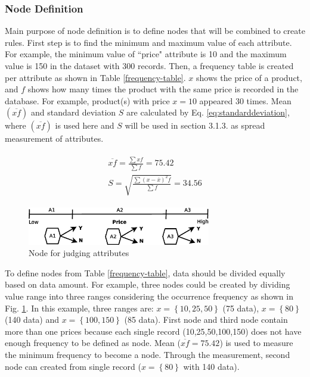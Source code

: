 \documentclass[fleqn,10pt,twocolumn]{SICE14}
\begin{document}
\subsubsection{Node Definition}
Main purpose of node definition is to define nodes that will be combined to create rules. First step is to find the minimum and maximum value of each attribute. For example, the minimum value of ``price" attribute is 10 and the maximum value is 150 in the dataset with 300 records. Then, a frequency table is created per attribute as shown in Table \ref{frequency-table}. 
$x$ shows the price of a product, and $f$ shows how many times the product with the same price is recorded in the database. For example, product(s) with price $x=10$ appeared 30 times.
Mean $(\overline{xf})$ and standard deviation $S$ are calculated by Eq. \ref{eq:standarddeviation}, where $(\overline{xf})$ is used here and $S$ will be used in section 3.1.3. as spread measurement of attributes.

\begin{eqnarray}
\begin{array}{lll}
\overline{xf}=\frac{\sum xf}{\sum f}=75.42 \\
S=\sqrt{\frac{\sum(x-\overline{x})^{2}f}{\sum f}}=34.56
\end{array}
\label{eq:standarddeviation}
\end{eqnarray}

\begin{figure}[tb]
\begin{center}
\includegraphics[width=8cm]{attributejudge}
\caption{\label{nodejudge} Node for judging attributes}
\end{center}
\end{figure}

To define nodes from Table \ref{frequency-table}, data should be divided equally based on data amount. For example, three nodes could be created by dividing value range into three ranges considering the occurrence frequency as shown in Fig. \ref{nodejudge}. In this example, three ranges are: $x = \left\{ 10,25,50 \right\} $ (75 data), $x = \left\{ 80 \right\} $ (140 data) and $x = \left\{ 100,150 \right\} $ (85 data). First node and third node contain more than one prices because each single record (10,25,50,100,150) does not have enough frequency to be defined as node. Mean ($\overline{xf}=75.42$) is used to measure the minimum frequency to become a node. Through the measurement, second node can created from single record ($x = \left\{ 80 \right\} $ with 140 data).
\end{document}
